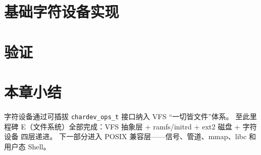 \section{基础字符设备实现}
\label{sec:devfs-devices}


\section{验证}
\label{sec:devfs-verify}


\section{本章小结}

字符设备通过可插拔 \texttt{chardev\_ops\_t} 接口纳入 VFS ``一切皆文件''体系。
至此里程碑 E（文件系统）全部完成：VFS 抽象层 + ramfs/initrd + ext2 磁盘 + 字符设备 四层递进。
下一部分进入 POSIX 兼容层——信号、管道、mmap、libc 和用户态 Shell。
